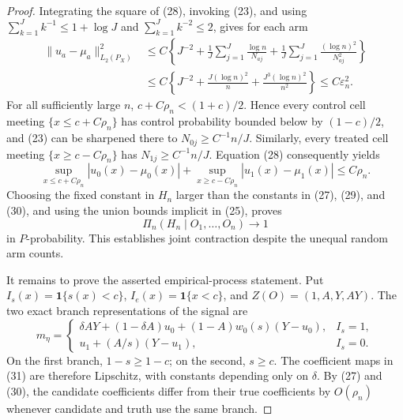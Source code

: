 \documentclass{article}
\begin{document}
\begin{proof}
Integrating the square of (28), invoking (23), and using
\(\sum_{k=1}^Jk^{-1}\le1+\log J\) and \(\sum_{k=1}^Jk^{-2}\le2\), gives for each arm
\begin{equation}
\begin{aligned}
 \|u_a-\mu_a\|_{L_2(P_X)}^2
 &\le C\left\{J^{-2}+\frac1J\sum_{j=1}^J\frac{\log n}{N_{aj}}
                   +\frac1J\sum_{j=1}^J\frac{(\log n)^2}{N_{aj}^2}\right\}\\
 &\le C\left\{J^{-2}+\frac{J(\log n)^2}{n}
                   +\frac{J^3(\log n)^2}{n^2}\right\}
 \le C\varepsilon_n^2.
\end{aligned}                                                                             \tag{29}
\end{equation}
For all sufficiently large \(n\), \(c+C\rho_n<(1+c)/2\).  Hence every control cell meeting \(\{x\le c+C\rho_n\}\) has control probability bounded below by \((1-c)/2\), and (23) can be sharpened there to \(N_{0j}\ge C^{-1}n/J\).  Similarly, every treated cell meeting \(\{x\ge c-C\rho_n\}\) has \(N_{1j}\ge C^{-1}n/J\).  Equation (28) consequently yields
\begin{equation}
 \sup_{x\le c+C\rho_n}|u_0(x)-\mu_0(x)|
 +\sup_{x\ge c-C\rho_n}|u_1(x)-\mu_1(x)|\le C\rho_n.                                  \tag{30}
\end{equation}
Choosing the fixed constant in \(H_n\) larger than the constants in (27), (29), and (30), and using the union bounds implicit in (25), proves
\begin{equation}
 \Pi_n(H_n\mid O_1,\ldots,O_n)\longrightarrow1
\end{equation}
in \(P\)-probability.  This establishes joint contraction despite the unequal random arm counts.

It remains to prove the asserted empirical-process statement.  Put
\(I_s(x)=\mathbf1\{s(x)<c\}\), \(I_e(x)=\mathbf1\{x<c\}\), and
\(Z(O)=(1,A,Y,AY)\).  The two exact branch representations of the signal are
\begin{equation}
 m_\eta=
 \begin{cases}
 \delta AY+(1-\delta A)u_0+(1-A)w_0(s)(Y-u_0),&I_s=1,\\
 u_1+(A/s)(Y-u_1),&I_s=0.
 \end{cases}                                                                             \tag{31}
\end{equation}
On the first branch, \(1-s\ge1-c\); on the second, \(s\ge c\).  The coefficient maps in (31) are therefore Lipschitz, with constants depending only on \(\delta\).  By (27) and (30), the candidate coefficients differ from their true coefficients by \(O(\rho_n)\) whenever candidate and truth use the same branch.


\end{proof}
\end{document}
